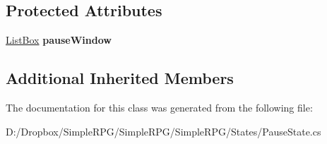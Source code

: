 \subsection*{Protected Attributes}
\begin{DoxyCompactItemize}
\item 
\hypertarget{class_simple_r_p_g_1_1_states_1_1_pause_state_a5ca649a458e41330e32f5f4cc68fc66e}{\hyperlink{class_simple_r_p_g_1_1_windows_1_1_list_box}{List\+Box} {\bfseries pause\+Window}}\label{class_simple_r_p_g_1_1_states_1_1_pause_state_a5ca649a458e41330e32f5f4cc68fc66e}

\end{DoxyCompactItemize}
\subsection*{Additional Inherited Members}


The documentation for this class was generated from the following file\+:\begin{DoxyCompactItemize}
\item 
D\+:/\+Dropbox/\+Simple\+R\+P\+G/\+Simple\+R\+P\+G/\+Simple\+R\+P\+G/\+States/Pause\+State.\+cs\end{DoxyCompactItemize}
